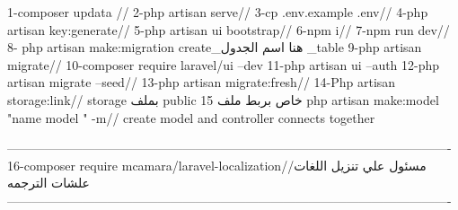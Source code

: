 1-composer updata //
2-php artisan serve//
3-cp .env.example .env//
4-php artisan key:generate//
5-php artisan ui bootstrap//
6-npm i//
7-npm run dev//
8- php artisan make:migration create_هنا اسم الجدول _table
9-php artisan migrate//
10-composer require laravel/ui --dev
11-php artisan ui --auth
12-php artisan migrate --seed//
13-php artisan migrate:fresh//
14-Php artisan storage:link// storage بملف public  خاص بربط ملف 
15 php artisan make:model "name model " -m// create model and controller connects together

----------------------------------------------------------------------------------------------------------
16-composer require mcamara/laravel-localization//مسئول علي تنزيل اللغات علشات الترجمه 
----------------------------------------------------------------------------------------------------------

